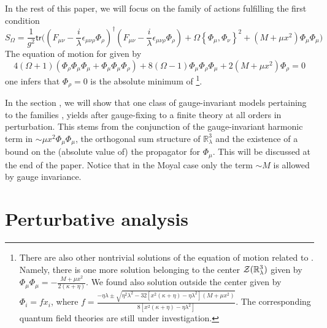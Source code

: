 \documentclass[10pt]{book}
\newcommand{\tr}{\mathsf{tr}}
\theoremstyle{break}
\begin{document}
In the rest of this paper, we will focus on the family of actions fulfilling the first condition %
\begin{equation}
S_\Omega = \frac{1}{g^2} \tr\big((F_{\mu\nu} - \frac{i}{\lambda} \epsilon_{\mu\nu\rho} \Phi_\rho)^\dag (F_{\mu\nu} - \frac{i}{\lambda} \epsilon_{\mu\nu\rho} \Phi_\rho) + \Omega\left\{\Phi_\mu,\Phi_\nu\right\}^2 + (M+\mu x^2) \Phi_\mu \Phi_\mu \big) %
\end{equation}
The equation of motion for %
given by
\begin{equation}
4(\Omega+1)(\Phi_\rho\Phi_\mu\Phi_\mu+\Phi_\mu\Phi_\mu\Phi_\rho)+8(\Omega-1)\Phi_\mu\Phi_\rho\Phi_\mu+2(M+\mu x^2) \Phi_\rho = 0%
\end{equation}
one infers that $\Phi_\rho=0$ is the absolute minimum of %
\footnote{There are also other nontrivial solutions of the equation of motion related to %
. Namely, there is one more solution belonging to the center ${\cal{Z}}(\mathbb{R}^3_\lambda)$ given by $\Phi_{\mu}\Phi_{\mu}=-\frac{M+\mu x^2}{2(\kappa+\eta)}$. We found also solution outside the center given by $\Phi_i=fx_i$, where $f=\frac{-\eta\lambda\pm\sqrt{\eta^2\lambda^2-32\left[x^2(\kappa+\eta)-\eta\lambda^2\right](M+\mu x^2)}}{8\left[x^2(\kappa+\eta)-\eta\lambda^2\right]}$. The corresponding quantum field theories are still under investigation. }.\par

In the section %
, we will show that one class of gauge-invariant models pertaining to the families %
, %
yields after gauge-fixing to a finite theory at all orders in perturbation. This stems from the conjunction of the gauge-invariant harmonic term in %
$\sim \mu x^2\Phi_\mu\Phi_\mu$, the orthogonal sum structure of $\mathbb{R}^3_\lambda$ %
and the existence of a bound on the (absolute value of) the propagator for $\Phi_\mu$. This will be discussed at the end of the paper. Notice that in the Moyal case only the term $\sim M$ is allowed by gauge invariance.

\chapter{Perturbative analysis}
\end{document}
